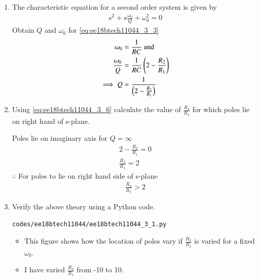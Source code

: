 \begin{enumerate}[label=\arabic*.,ref=\theenumi]
\item The characteristic equation for a second order system is given by 
\begin{align}
    s^2 + s\frac{\omega_0}{Q} + \omega_0^2 = 0 \label{eq:ee18btech11044_3_4}
\end{align}
%
Obtain  $Q$ and $\omega_0$ for  \eqref{eq:ee18btech11044_3_3} 
\\
\solution
\begin{align}
    \omega_0 &= \frac{1}{RC} \label{eq:ee18btech11044_3_5} \text{ and }\\
    \frac{\omega_0}{Q} &= \frac{1}{RC}\brak{2 - \frac{R_2}{R_1}} \\
\implies     Q &= \frac{1}{\brak{2 - \frac{R_2}{R_1}}} \label{eq:ee18btech11044_3_6} 
\end{align}
\item 
Using   \eqref{eq:ee18btech11044_3_6} calculate the value of $\frac{R_2}{R_1}$ for which poles lie on right hand of s-plane.

\solution 

Poles lie on imaginary axis for $Q = \infty$
\begin{align}
    2 - \frac{R_2}{R_1} = 0 \\
    \frac{R_2}{R_1} = 2
\end{align}
$\therefore$ For poles to lie on right hand side of s-plane
\begin{align}
    \frac{R_2}{R_1} >2
\end{align}


\item
Verify the above theory using a Python code.

\solution

\begin{lstlisting}
codes/ee18btech11044/ee18btech11044_3_1.py
\end{lstlisting}
\begin{itemize}
    \item This figure shows how the location of poles vary if $\frac{R_2}{R_1}$ is varied for a fixed $\omega_0$.
    \item I have varied $\frac{R_2}{R_1}$ from -10 to 10. 
\end{itemize}


\end{enumerate}
